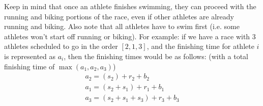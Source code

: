 \documentclass{article}
\begin{document}
	\noindent Keep in mind that once an athlete finishes swimming, they can proceed with the running and biking portions of the race, even if other athletes are already running and biking. Also note that all athletes have to swim first (i.e. some athletes won't start off running or biking). For example: if we have a race with 3 athletes scheduled to go in the order $[2,1,3]$, and the finishing time for athlete $i$ is represented as $a_i$, then the finishing times would be as follows: (with a total finishing time of $\max(a_1,a_2,a_3)$)
	\begin{gather*}
		a_2 = (s_2) + r_2 + b_2 \\
		a_1 = (s_2 + s_1) + r_1 + b_1 \\ 
		a_3 = (s_2 + s_1 + s_3) + r_3 + b_3
	\end{gather*}
	
\end{document}
